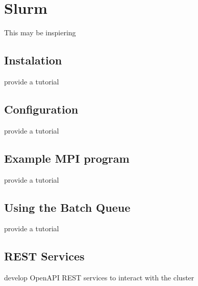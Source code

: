 \chapter{Slurm}

This may be inspiering 



\section{Instalation}

\begin{exercise}
provide a tutorial 
\end{exercise}

\section{Configuration}

\begin{exercise}
provide a tutorial 
\end{exercise}

\section{Example MPI program}

\begin{exercise}
provide a tutorial 
\end{exercise}

\section{Using the Batch Queue}

\begin{exercise}
provide a tutorial 
\end{exercise}

\section{REST Services}

\begin{exercise}
develop OpenAPI REST services to interact with the cluster
\end{exercise}




